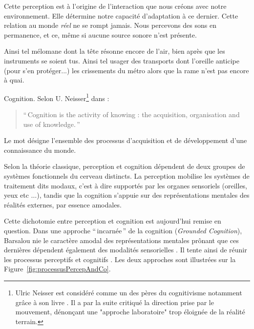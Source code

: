 Cette perception est à l'origine de l'interaction que nous créons avec notre environnement. Elle détermine notre capacité d'adaptation à ce dernier. Cette relation au monde \emph{réel} ne se rompt jamais. Nous percevons des sons en permanence, et ce, même si aucune source sonore n'est présente. 

Ainsi tel mélomane dont la tête résonne encore de l'air, bien après que les instruments se soient tus. Ainsi tel usager des transports dont l'oreille anticipe (pour s'en protéger...) les crissements du métro alors que la rame n'est pas encore à quai.

Cognition. Selon U. Neisser\footnote{Ulric Neisser est considéré comme un des pères du cognitivisme notamment grâce à son livre \citep{neisser1967cognitive}. Il a par la suite critiqué la direction prise par le mouvement, dénonçant une "approche laboratoire" trop éloignée de la réalité terrain.} dans \citep[p. ??]{neisser1976cognition}:

\begin{quote}
``\,Cognition is the activity of knowing : the acquisition, organisation and use of knowledge.\,''
\end{quote}

Le mot désigne l'ensemble des processus d'acquisition et de développement d'une connaissance du monde. 

Selon la théorie classique, perception et cognition dépendent de deux groupes de systèmes fonctionnels du cerveau distincts. La perception mobilise les systèmes de traitement dits modaux, c'est à dire supportés par les organes sensoriels (oreilles, yeux etc $\ldots$), tandis que la cognition s'appuie sur des représentations mentales des réalités externes, par essence amodales.
 
Cette dichotomie entre perception et cognition est aujourd'hui remise en question. Dans une approche ``\,incarnée\,'' de la cognition (\emph{Grounded Cognition}), Barsalou nie le caractère amodal des représentations mentales prônant que ces dernières dépendent également des modalités sensorielles \citep{barsalou2010grounded}. Il tente ainsi de réunir les processus perceptifs et cognitifs \citep{goldstone1998reuniting, barsalou1999perceptions}.
Les deux approches sont illustrées sur la Figure~\ref{fig:processusPercepAndCo}.

